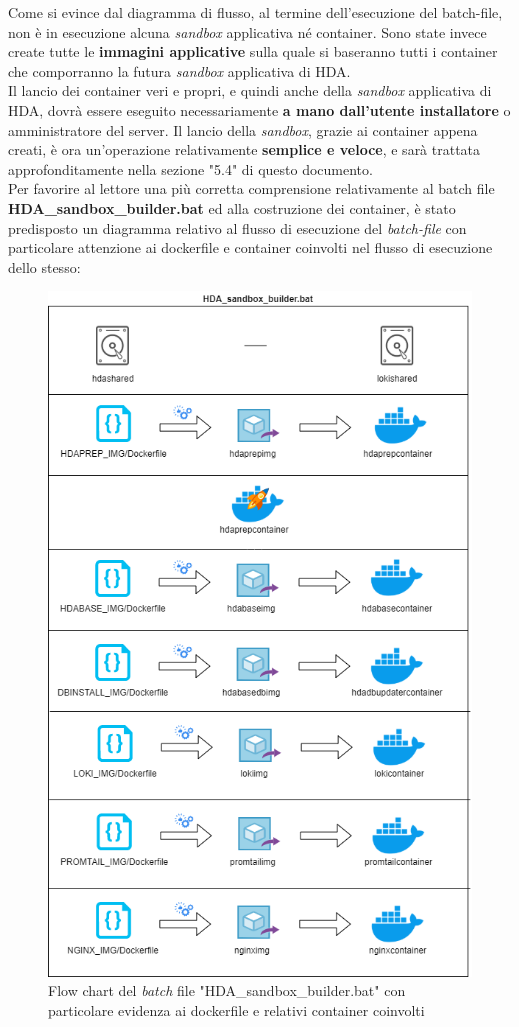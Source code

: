 Come si evince dal diagramma di flusso, al termine dell'esecuzione del batch-file, non è in esecuzione alcuna \textit{sandbox} applicativa né container. Sono state invece create tutte le \textbf{immagini applicative} sulla quale si baseranno tutti i container che comporranno la futura \textit{sandbox} applicativa di HDA.\\
Il lancio dei container veri e propri, e quindi anche della \textit{sandbox} applicativa di HDA, dovrà essere eseguito necessariamente \textbf{a mano dall'utente installatore} o amministratore del server.
Il lancio della \textit{sandbox}, grazie ai container appena creati, è ora un'operazione relativamente \textbf{semplice e veloce}, e sarà trattata approfonditamente nella sezione "5.4" di questo documento.\\
Per favorire al lettore una più corretta comprensione relativamente al batch file \textbf{HDA\_sandbox\_builder.bat} ed alla costruzione dei container, è stato predisposto un diagramma relativo al flusso di esecuzione del \textit{batch-file} con particolare attenzione ai dockerfile e container coinvolti nel flusso di esecuzione dello stesso:
\begin{figure}[!h]     
\centering 
    \includegraphics[width=0.7 \columnwidth]{immagini/flowchart/flow_chart_HDA_sandbox_builder} 
    \caption{Flow chart del \textit{batch} file "HDA\_sandbox\_builder.bat" con particolare evidenza ai dockerfile e relativi container coinvolti}
\end{figure}\\
\newpage
